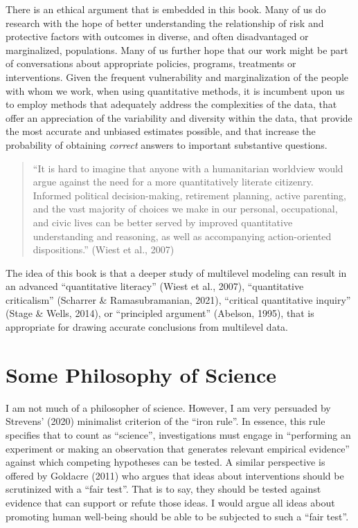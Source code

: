 \documentclass[
  letterpaper,
  DIV=11,
  numbers=noendperiod]{scrreprt}
\begin{document}
There is an ethical argument that is embedded in this book. Many of us
do research with the hope of better understanding the relationship of
risk and protective factors with outcomes in diverse, and often
disadvantaged or marginalized, populations. Many of us further hope that
our work might be part of conversations about appropriate policies,
programs, treatments or interventions. Given the frequent vulnerability
and marginalization of the people with whom we work, when using
quantitative methods, it is incumbent upon us to employ methods that
adequately address the complexities of the data, that offer an
appreciation of the variability and diversity within the data, that
provide the most accurate and unbiased estimates possible, and that
increase the probability of obtaining \emph{correct} answers to
important substantive questions.

\begin{quote}
``It is hard to imagine that anyone with a humanitarian worldview would
argue against the need for a more quantitatively literate citizenry.
Informed political decision-making, retirement planning, active
parenting, and the vast majority of choices we make in our personal,
occupational, and civic lives can be better served by improved
quantitative understanding and reasoning, as well as accompanying
action-oriented dispositions.'' (Wiest et al., 2007)
\end{quote}

The idea of this book is that a deeper study of multilevel modeling can
result in an advanced ``quantitative literacy'' (Wiest et al., 2007),
 ``quantitative criticalism'' (Scharrer \&
Ramasubramanian, 2021),  ``critical
quantitative inquiry'' (Stage \& Wells, 2014),
 or ``principled argument''
(Abelson, 1995),  that is appropriate for
drawing accurate conclusions from multilevel data.

\section{Some Philosophy of Science}\label{sec-science}

I am not much of a philosopher of science. 
However, I am very persuaded by Strevens' (2020) minimalist criterion of
the ``iron rule''. In essence, this rule specifies that to count as
``science'', investigations must engage in ``performing an experiment or
making an observation that generates relevant empirical evidence''
against which competing hypotheses can be tested. A similar perspective
is offered by Goldacre (2011) who argues that ideas about interventions
should be scrutinized with a ``fair test''. That is to say, they should
be tested against evidence that can support or refute those ideas. I
would argue all ideas about promoting human well-being should be able to
be subjected to such a ``fair test''.
\end{document}
